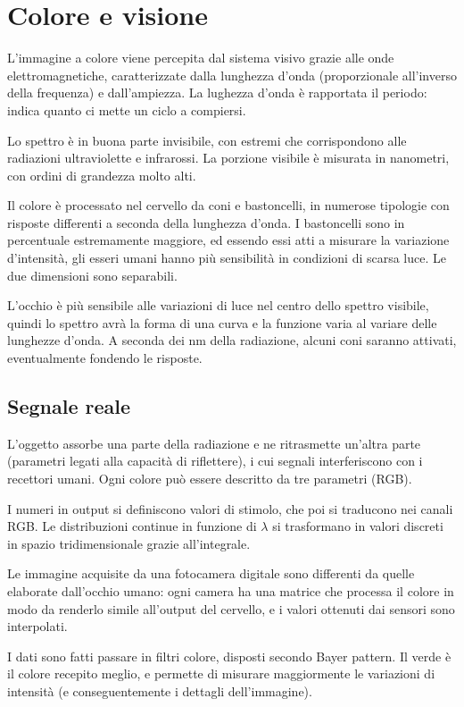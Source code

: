 \section{Colore e visione}
L'immagine a colore viene percepita dal sistema visivo grazie alle onde elettromagnetiche, caratterizzate dalla lunghezza d'onda (proporzionale all'inverso della frequenza) e dall'ampiezza. La lughezza d'onda è rapportata il periodo: indica quanto ci mette un ciclo a compiersi.

Lo spettro è in buona parte invisibile, con estremi che corrispondono alle radiazioni ultraviolette e infrarossi. La porzione visibile è misurata in nanometri, con ordini di grandezza molto alti.

Il colore è processato nel cervello da coni e bastoncelli, in numerose tipologie con risposte differenti a seconda della lunghezza d'onda. I bastoncelli sono in percentuale estremamente maggiore, ed essendo essi atti a misurare la variazione d'intensità, gli esseri umani hanno più sensibilità in condizioni di scarsa luce. Le due dimensioni sono separabili. 

L'occhio è più sensibile alle variazioni di luce nel centro dello spettro visibile, quindi lo spettro avrà la forma di una curva e la funzione varia al variare delle lunghezze d'onda. A seconda dei nm della radiazione, alcuni coni saranno attivati, eventualmente fondendo le risposte. 

\subsection{Segnale reale}
L'oggetto assorbe una parte della radiazione e ne ritrasmette un'altra parte (parametri legati alla capacità di riflettere), i cui segnali interferiscono con i recettori umani. Ogni colore può essere descritto da tre parametri (RGB).

I numeri in output si definiscono valori di stimolo, che poi si traducono nei canali RGB. Le distribuzioni continue in funzione di $\lambda$ si trasformano in valori discreti in spazio tridimensionale grazie all'integrale.

Le immagine acquisite da una fotocamera digitale sono differenti da quelle elaborate dall'occhio umano: ogni camera ha una matrice che processa il colore in modo da renderlo simile all'output del cervello, e i valori ottenuti dai sensori sono interpolati. 

I dati sono fatti passare in filtri colore, disposti secondo Bayer pattern. Il verde è il colore recepito meglio, e permette di misurare maggiormente le variazioni di intensità (e conseguentemente i dettagli dell'immagine). 

